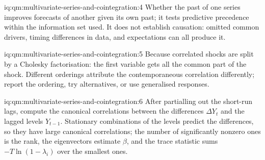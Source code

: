\begin{solution}{iq:qm:multivariate-series-and-cointegration:4}
Whether the past of one series improves forecasts of another given its own past; it tests predictive precedence within the information set used. It does not establish
causation: omitted common drivers, timing differences in data, and expectations can all produce it.
\end{solution}

\begin{solution}{iq:qm:multivariate-series-and-cointegration:5}
Because correlated shocks are split by a Cholesky factorisation: the first variable gets all the common part of the shock. Different orderings attribute the
contemporaneous correlation differently; report the ordering, try alternatives, or use generalised responses.
\end{solution}

\begin{solution}{iq:qm:multivariate-series-and-cointegration:6}
After partialling out the short-run lags, compute the canonical correlations between the differences $\Delta Y_t$ and the lagged levels $Y_{t-1}$. Stationary
combinations of the levels predict the differences, so they have large canonical correlations; the number of significantly nonzero ones is the rank, the
eigenvectors estimate $\beta$, and the trace statistic sums $-T\ln(1 - \lambda_i)$ over the smallest ones.
\end{solution}
